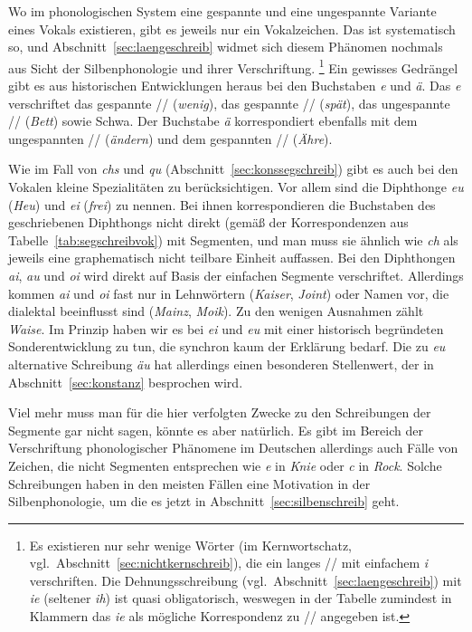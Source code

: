 Wo im phonologischen System eine gespannte und eine ungespannte Variante eines Vokals existieren, gibt es jeweils nur ein Vokalzeichen.
Das ist systematisch so, und Abschnitt~\ref{sec:laengeschreib} widmet sich diesem Phänomen nochmals aus Sicht der Silbenphonologie und ihrer Verschriftung.%
\footnote{Es existieren nur sehr wenige Wörter (im Kernwortschatz, vgl.\ Abschnitt~\ref{sec:nichtkernschreib}), die ein langes // mit einfachem \textit{i} verschriften.
Die Dehnungsschreibung (vgl.\ Abschnitt~\ref{sec:laengeschreib}) mit \textit{ie} (seltener \textit{ih}) ist quasi obligatorisch, weswegen in der Tabelle zumindest in Klammern das \textit{ie} als mögliche Korrespondenz zu // angegeben ist.}
Ein gewisses Gedrängel gibt es aus historischen Entwicklungen heraus bei den Buchstaben \textit{e} und \textit{ä}.
Das \textit{e} verschriftet das gespannte // (\textit{wenig}), das gespannte // (\textit{spät}), das ungespannte // (\textit{Bett}) sowie Schwa.
Der Buchstabe \textit{ä} korrespondiert ebenfalls mit dem ungespannten // (\textit{ändern}) und dem  gespannten // (\textit{Ähre}).

Wie im Fall von \textit{chs} und \textit{qu} (Abschnitt~\ref{sec:konssegschreib}) gibt es auch bei den Vokalen kleine Spezialitäten zu berücksichtigen.
Vor allem sind die Diphthonge \textit{eu} (\textit{Heu}) und \textit{ei} (\textit{frei}) zu nennen.
Bei ihnen korrespondieren die Buchstaben des geschriebenen Diphthongs nicht direkt (gemäß der Korrespondenzen aus Tabelle~\ref{tab:segschreibvok}) mit Segmenten, und man muss sie ähnlich wie \textit{ch} als jeweils eine graphematisch nicht teilbare Einheit auffassen.
Bei den Diphthongen \textit{ai}, \textit{au} und \textit{oi} wird direkt auf Basis der einfachen Segmente verschriftet.
Allerdings kommen \textit{ai} und \textit{oi} fast nur in Lehnwörtern (\textit{Kaiser}, \textit{Joint}) oder Namen vor, die dialektal beeinflusst sind (\textit{Mainz}, \textit{Moik}).
Zu den wenigen Ausnahmen zählt \textit{Waise}.
Im Prinzip haben wir es bei \textit{ei} und \textit{eu} mit einer historisch begründeten Sonderentwicklung zu tun, die synchron kaum der Erklärung bedarf.
Die zu \textit{eu} alternative Schreibung \textit{äu} hat allerdings einen besonderen Stellenwert, der in Abschnitt~\ref{sec:konstanz} besprochen wird.

Viel mehr muss man für die hier verfolgten Zwecke zu den Schreibungen der Segmente gar nicht sagen, könnte es aber natürlich.
Es gibt im Bereich der Verschriftung phonologischer Phänomene im Deutschen allerdings auch Fälle von Zeichen, die nicht Segmenten entsprechen wie \textit{e} in \textit{Knie} oder \textit{c} in \textit{Rock}.
Solche Schreibungen haben in den meisten Fällen eine Motivation in der Silbenphonologie, um die es jetzt in Abschnitt~\ref{sec:silbenschreib} geht.

